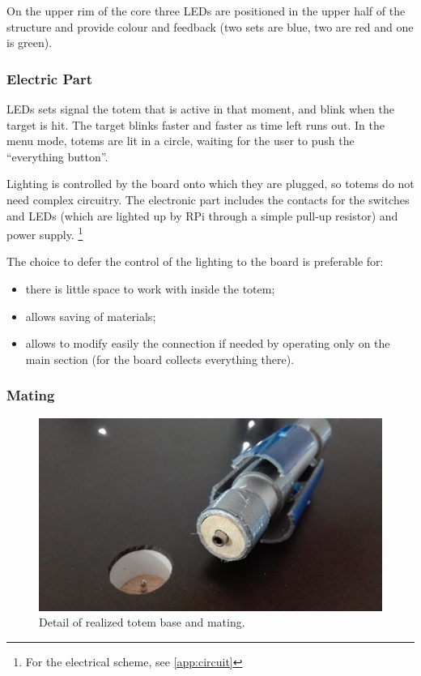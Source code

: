 \documentclass[a4paper,twoside]{book}
\begin{document}
On the upper rim of the core three LEDs are positioned in the upper half of the structure and provide colour and feedback (two sets are blue, two are red and one is green).

\subsubsection{Electric Part}
LEDs sets signal the totem that is active in that moment, and blink when the target is hit. The target blinks faster and faster as time left runs out. In the menu mode, totems are lit in a circle, waiting for the user to push the \textquotedblleft everything button\textquotedblright.

Lighting is controlled by the board onto which they are plugged, so totems do not need complex circuitry. The electronic part includes the contacts for the switches and LEDs (which are lighted up by RPi through a simple pull-up resistor) and power supply.
\footnote{For the electrical scheme, see \autoref{app:circuit}}

\beforelist The choice to defer the control of the lighting to the board is preferable for:
\begin{itemize}
\item there is little space to work with inside the totem;
\item allows saving of materials;
\item allows to modify easily the connection if needed by operating only on the main section (for the board collects everything there).
\end{itemize}
\afterlist*

\subsubsection{Mating}

\begin{figure}[h]
\includegraphics[width=\linewidth]{img/IMG_20160616_114517} 
\caption{Detail of realized totem base and mating.}
\end{figure}
\end{document}
